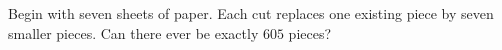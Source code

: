 Begin with seven sheets of paper. Each cut replaces one existing piece by seven smaller pieces. Can there ever be exactly $605$ pieces?
